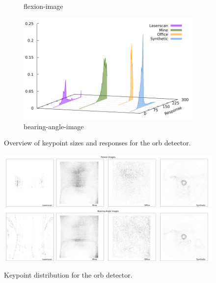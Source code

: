 \begin{figure}[H]
\begin{subfigure}[t]{0.45\linewidth}
    \caption{\gls{flexion-image}}
\end{subfigure}\quad
\begin{subfigure}[t]{0.45\linewidth}
    \includegraphics[width=\linewidth]{chapter06/results/ORB/bearing/response.pdf}
    \caption{\gls{bearing-angle-image}}
\end{subfigure}
    \caption{Overview of keypoint sizes and responses for the \acrshort{orb} detector.}
\end{figure}
\begin{figure}[H]
    \includegraphics[width=\linewidth]{chapter06/results/ORB/flexion/distribution.pdf}\\
    \includegraphics[width=\linewidth]{chapter06/results/ORB/bearing/distribution.pdf}%
    \caption{Keypoint distribution for the \acrshort{orb} detector.}
\end{figure}
